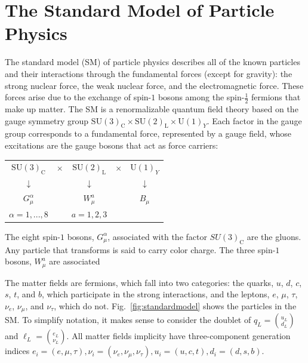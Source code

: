 \section{The Standard Model of Particle Physics}

The standard model (SM) of particle physics describes all of the known
particles and their interactions through the fundamental forces
(except for gravity): the strong nuclear force, the weak nuclear force, and the electromagnetic
force. These forces arise due to the exchange of spin-$1$
bosons among the spin-$\frac{1}{2}$ fermions that make up matter. The SM is a renormalizable quantum field
theory based on the gauge symmetry group $\mathrm{SU(3)}_{\mathrm{C}}\times \mathrm{SU(2)}_{\mathrm{L}}\times
\mathrm{U(1)}_Y$. Each factor in the gauge group corresponds to a fundamental force, represented by a gauge field, whose excitations are
the gauge bosons that act as force carriers:
\begin{center}
\begin{tabular}{ccccc}
$\mathrm{SU(3)}_{\mathrm{C}}$ &$\times$& $\mathrm{SU(2)}_{\mathrm{L}}$
  &$\times$& $\mathrm{U(1)}_Y$\\
 $\downarrow$&&$\downarrow$&&$\downarrow$\\
 $G_{\mu}^{\alpha}$&&$W^a_{\mu}$&&$B_{\mu}$\\
 $\alpha=1,...,8$&&$a=1,2,3$&&
\end{tabular}
\end{center}
The eight spin-$1$ bosons, $G_{\mu}^{\alpha}$,
associated with the factor $SU(3)_{\mathrm{C}}$ are the gluons. Any
particle that transforms is said to carry color charge. The three spin-$1$
bosons, $W^{a}_{\mu}$ are associated 

The matter fields are fermions, which fall into two
categories: the quarks, $u$, $d$, $c$, $s$, $t$, and $b$, which participate in the
strong interactions, and the leptons, $e$, $\mu$, $\tau$, $\nu_e$,
$\nu_{\mu}$, and $\nu_{\tau}$, which do
not. Fig.~\ref{fig:standardmodel} shows the particles in the SM. To simplify notation, it makes sense to consider the doublet of
$q_L = \binom{u_L}{d_L}$ and $\ell_L = \binom{e_L}{\nu_L}$. All matter fields implicity have
three-component generation indices $e_i=(e,\mu,\tau),
\nu_i=(\nu_e,\nu_{\mu},\nu_{\tau}), u_i=(u,c,t),
d_i=(d,s,b)$. 

